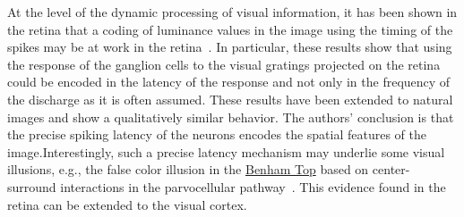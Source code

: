 \documentclass[brainsci, %
               review,submit,pdftex,moreauthors%
               ]{Definitions/mdpi}
\begin{document}
%
At the level of the dynamic processing of visual information, it has been shown in the retina that a coding of luminance values in the image using the timing of the spikes may be at work in the retina~\citep{gollisch_rapid_2008}. In particular, these results show that using  the response of the ganglion cells to the visual gratings projected on the retina could be encoded in the latency of the response and not only in the frequency of the discharge as it is often assumed. These results have been extended to natural images and show a qualitatively similar behavior. The authors' conclusion is that the precise spiking latency of the neurons encodes the spatial features of the image.Interestingly, such a precise latency mechanism may underlie some visual illusions, e.g., the false color illusion in the \href{https://michaelbach.de/ot/col-Benham/index.html}{Benham Top} based on center-surround interactions in the parvocellular pathway~\citep{kenyon_theory_2004}. This evidence found in the retina  can be extended to the visual cortex.
\end{document}
